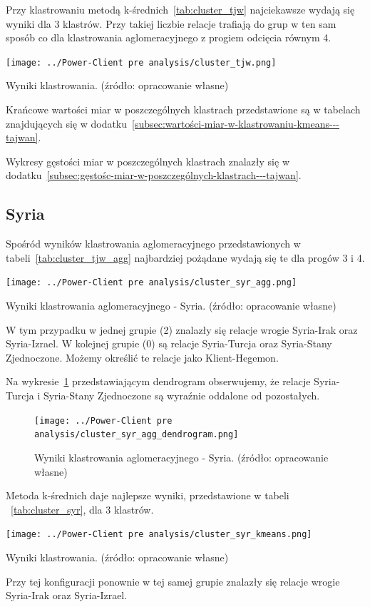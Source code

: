 \documentclass[11pt]{report}
\begin{document}
    Przy klastrowaniu metodą k-średnich~\ref{tab:cluster_tjw} najciekawsze wydają się wyniki dla 3 klastrów.
    Przy takiej liczbie relacje trafiają do grup w ten sam sposób co dla klastrowania aglomeracyjnego z progiem odcięcia równym 4.
    \begin{table}[!htp]
        \centering
        \texttt{[image: ../Power-Client pre analysis/cluster\_tjw.png]}
        \caption{Wyniki klastrowania. (źródło: opracowanie własne)}
        \label{tab:cluster_tjw}
    \end{table}


    Krańcowe wartości miar w poszczególnych klastrach przedstawione są w tabelach
    znajdujących się w dodatku~\ref{subsec:wartości-miar-w-klastrowaniu-kmeans---tajwan}.

    Wykresy gęstości miar w poszczególnych klastrach znalazły się w dodatku~\ref{subsec:gęstośc-miar-w-poszczególnych-klastrach---tajwan}.

    \subsection{Syria}

    Spośród wyników klastrowania aglomeracyjnego przedstawionych w tabeli~\ref{tab:cluster_tjw_agg} najbardziej pożądane wydają się
    te dla progów 3 i 4.
    \begin{table}[!htp]
        \centering
        \texttt{[image: ../Power-Client pre analysis/cluster\_syr\_agg.png]}
        \caption{Wyniki klastrowania aglomeracyjnego - Syria. (źródło: opracowanie własne)}
        \label{tab:cluster_syr_agg}
    \end{table}
    W tym przypadku w jednej grupie (2) znalazły się relacje wrogie Syria-Irak oraz Syria-Izrael.
    W kolejnej grupie (0) są relacje Syria-Turcja oraz Syria-Stany Zjednoczone.
    Możemy określić te relacje jako Klient-Hegemon.


    Na wykresie~\ref{fig:cluster_syr_agg_dendrogram} przedstawiającym dendrogram obserwujemy, że relacje
    Syria-Turcja i Syria-Stany Zjednoczone są wyraźnie oddalone od pozostałych.
    \begin{figure}[!htp]
        \centering
        \texttt{[image: ../Power-Client pre analysis/cluster\_syr\_agg\_dendrogram.png]}
        \caption{Wyniki klastrowania aglomeracyjnego - Syria. (źródło: opracowanie własne)}
        \label{fig:cluster_syr_agg_dendrogram}
    \end{figure}

    Metoda k-średnich daje najlepsze wyniki, przedstawione w tabeli ~\ref{tab:cluster_syr}, dla 3 klastrów.
    \begin{table}[!htp]
        \centering
        \texttt{[image: ../Power-Client pre analysis/cluster\_syr\_kmeans.png]}
        \caption{Wyniki klastrowania. (źródło: opracowanie własne)}
        \label{tab:cluster_syr}
    \end{table}
    Przy tej konfiguracji ponownie w tej samej grupie znalazły się relacje wrogie Syria-Irak oraz Syria-Izrael.
\end{document}
